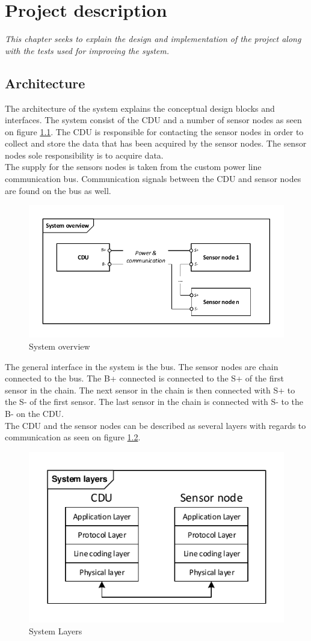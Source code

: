 \chapter{Project description}
\textit{This chapter seeks to explain the design and implementation of the project along with the tests used for improving the system.}
\section{Architecture}
The architecture of the system explains the conceptual design blocks and interfaces. The system consist of the CDU and a number of sensor nodes as seen on figure \ref{fig:systembdd}. The CDU is responsible for contacting the sensor nodes in order to collect and store the data that has been acquired by the sensor nodes. The sensor nodes sole responsibility is to acquire data.\\
The supply for the sensors nodes is taken from the custom power line communication bus. Communication signals between the CDU and sensor nodes are found on the bus as well.
\begin{figure}[H]
	\centering
	\includegraphics[width=.9\textwidth]{billeder/11ProjectDescription/systembdd}
	\caption{System overview}
	\label{fig:systembdd}
\end{figure}
The general interface in the system is the bus. The sensor nodes are chain connected to the bus. The B+ connected is connected to the S+ of the first sensor in the chain. The next sensor in the chain is then connected with S+ to the S- of the first sensor. The last sensor in the chain is connected with S- to the B- on the CDU.\\
The CDU and the sensor nodes can be described as several layers with regards to communication as seen on figure \ref{fig:systemlayers}.
\begin{figure}[H]
	\centering
	\includegraphics[width=.6\textwidth]{billeder/11ProjectDescription/System_Layers}
	\caption{System Layers}
	\label{fig:systemlayers}
\end{figure}
